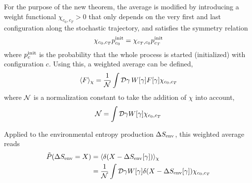 For the purpose of the new theorem, the average  is modified by introducing a weight functional \(\chi_{c_0,c_T} > 0\) that only depends on the very first and last configuration along the stochastic trajectory, and satisfies the symmetry relation
%
\begin{align}
	\label{eqn:chi symmetry}
	\chi_{c_0,c_T}p_{c_0}^{\text{init}} = \chi_{c_T,c_0}p_{c_T}^{\text{init}}
\end{align}
%
where \(p_c^{\text{init}}\) is the probability that the whole process is started (initialized) with configuration \(c\). Using this, a weighted average can be defined,
%
\begin{align}
	\label{eqn:weighted functional average}
	\langle F\rangle_\chi
	= \frac1{\mathcal{N}} \int \mathcal{D} \gamma\, W[\gamma] F[\gamma] \chi_{c_0,c_T}
\end{align}
%
where \(\mathcal{N}\) is a normalization constant to take the addition of \(\chi\) into account,
%
\begin{align}
	\label{eqn:weighted normalized}
	\mathcal{N} = \int\mathcal{D}\gamma W[\gamma] \chi_{c_0,c_T}
\end{align}


Applied to the environmental entropy production \(\Delta S_\text{env}\), this weighted average reads
%
\begin{equation}
	\begin{split}
	\label{eqn:P(SEnv)}
	\tilde P(\Delta S_\text{env} = X)
	&= \langle \delta(X-\Delta S_\text{env}[\gamma])\rangle_\chi \\
	&= \frac1{\mathcal{N}} \int\mathcal{D}\gamma W[\gamma] \delta(X-\Delta S_\text{env}[\gamma]) \chi_{c_0,c_T}
	\end{split}
\end{equation}

